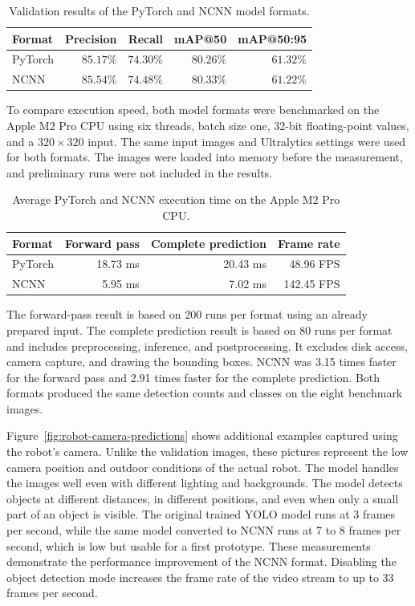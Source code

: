 \documentclass[a4paper,12pt]{report}
\begin{document}
\begin{table}[H]
\centering
\begin{tabular}{lrrrr}
\hline
\textbf{Format} & \textbf{Precision} & \textbf{Recall} & \textbf{mAP@50} &
\textbf{mAP@50:95} \\
\hline
PyTorch & $85.17\%$ & $74.30\%$ & $80.26\%$ & $61.32\%$ \\
NCNN & $85.54\%$ & $74.48\%$ & $80.33\%$ & $61.22\%$ \\
\hline
\end{tabular}
\caption{Validation results of the PyTorch and NCNN model formats.}
\label{tab:model-format-comparison}
\end{table}

To compare execution speed, both model formats were benchmarked on the Apple M2 Pro CPU using six
threads, batch size one, 32-bit floating-point values, and a $320 \times 320$ input. The same input
images and Ultralytics settings were used for both formats. The images were loaded into memory
before the measurement, and preliminary runs were not included in the results.

\begin{table}[H]
\centering
\begin{tabular}{lrrr}
\hline
\textbf{Format} & \textbf{Forward pass} & \textbf{Complete prediction} & \textbf{Frame rate} \\
\hline
PyTorch & 18.73 ms & 20.43 ms & 48.96 FPS \\
NCNN & 5.95 ms & 7.02 ms & 142.45 FPS \\
\hline
\end{tabular}
\caption{Average PyTorch and NCNN execution time on the Apple M2 Pro CPU.}
\label{tab:model-speed-comparison}
\end{table}

The forward-pass result is based on 200 runs per format using an already prepared input. The
complete prediction result is based on 80 runs per format and includes preprocessing, inference,
and postprocessing. It excludes disk access, camera capture, and drawing the bounding boxes. NCNN
was 3.15 times faster for the forward pass and 2.91 times faster for the complete prediction. Both
formats produced the same detection counts and classes on the eight benchmark images.

Figure~\ref{fig:robot-camera-predictions} shows additional examples captured using the robot's
camera. Unlike the validation images, these pictures represent the low camera position and outdoor
conditions of the actual robot. The model handles the images well even with different lighting and
backgrounds. The model detects objects at different distances, in different positions, and even when
only a small part of an object is visible. The original trained YOLO model runs at 3 frames per
second, while the same model converted to NCNN runs at 7 to 8 frames per second, which is low but
usable for a first prototype. These measurements demonstrate the performance improvement of the
NCNN format. Disabling the object detection mode increases the frame rate of the video stream to up
to 33 frames per second.
\end{document}
